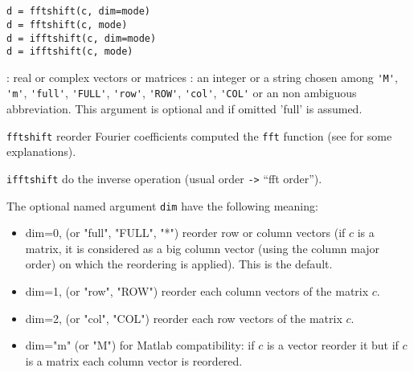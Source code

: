 
\begin{mandesc}
  \\
  \\
\end{mandesc}

\begin{calling_sequence}
\begin{verbatim}
d = fftshift(c, dim=mode)
d = fftshift(c, mode)
d = ifftshift(c, dim=mode)
d = ifftshift(c, mode)
\end{verbatim}
\end{calling_sequence}
\begin{parameters}
  \begin{varlist}
    : real or complex vectors or matrices
    : an integer or a string chosen among \verb+'M'+, \verb+'m'+, \verb+'full'+, \verb+'FULL'+, \verb+'row'+,
    \verb+'ROW'+, \verb+'col'+, \verb+'COL'+ or an non ambiguous abbreviation. 
    This argument is optional and if omitted 'full' is assumed.
  \end{varlist}
\end{parameters}

\begin{mandescription}

\verb+fftshift+ reorder Fourier coefficients computed the \verb+fft+ function (see 
for some explanations).

\verb+ifftshift+ do the inverse operation (usual order \verb+->+ ``fft order'').

The optional named argument \verb+dim+ have the following meaning:
\begin{itemize}
\item dim=0, (or "full", "FULL", "*") reorder row or column vectors (if $c$ is a 
matrix, it is considered as a big column vector (using the column major order) on which 
the reordering is applied). This is the default.
\item dim=1, (or "row", "ROW") reorder each column vectors of the matrix $c$.
\item dim=2, (or "col", "COL") reorder each row vectors of the matrix $c$.
\item dim="m" (or "M") for Matlab compatibility: if $c$ is a vector reorder it but if
$c$ is a matrix each column vector is reordered.
\end{itemize}

\end{mandescription}
 
